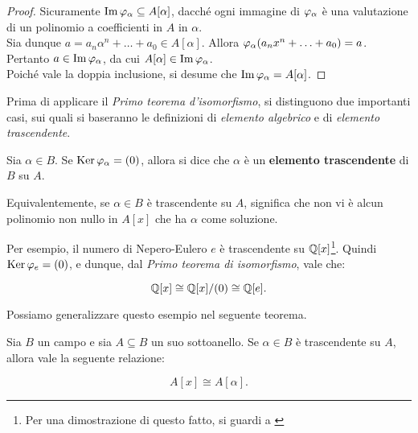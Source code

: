 \documentclass[11pt]{scrbook}
\begin{document}
\begin{proof} Sicuramente $\operatorname{Im} \varphi_\alpha \subseteq A[\alpha]$,
    dacché ogni immagine di $\varphi_\alpha$ è una valutazione di un
    polinomio a coefficienti in $A$ in $\alpha$. \\

    Sia dunque $a=a_n \alpha^n + \ldots + a_0 \in A[\alpha]$. Allora
    $\varphi_\alpha(a_n x^n + \ldots + a_0) = a$. Pertanto $a \in \operatorname{Im}
        \varphi_\alpha$, da cui $A[\alpha] \in \operatorname{Im} \varphi_\alpha$. \\

    Poiché vale la doppia inclusione, si desume che $\operatorname{Im} \varphi_\alpha =
        A[\alpha]$.
\end{proof}

Prima di applicare il \textit{Primo teorema d'isomorfismo}, si
distinguono due importanti casi, sui quali si baseranno le
definizioni di \textit{elemento algebrico} e di
\textit{elemento trascendente}.

\begin{definition}
    Sia $\alpha \in B$. Se $\operatorname{Ker} \varphi_\alpha = (0)$, allora si
    dice che $\alpha$ è un \textbf{elemento trascendente} di
    $B$ su $A$.
\end{definition}

\begin{remark*}
    Equivalentemente, se $\alpha \in B$ è trascendente su $A$,
    significa che non vi è alcun polinomio non nullo in $A[x]$ che ha $\alpha$
    come soluzione.
\end{remark*}

\begin{example}
    Per esempio, il numero di Nepero-Eulero $e$ è trascendente su $\mathbb{Q}[x]$\footnote{Per una dimostrazione di questo fatto, si
        guardi a \cite[pp.~234-237]{herstein2010algebra}}. Quindi
    $\operatorname{Ker} \varphi_e = (0)$, e dunque, dal \textit{Primo teorema di
        isomorfismo}, vale che:

    \[ \mathbb{Q}[x] \cong \mathbb{Q}[x]/(0) \cong \mathbb Q[e]. \]
\end{example}

Possiamo generalizzare questo esempio nel seguente teorema.

\begin{theorem}
    \label{th:isomorfismo_trascendente}
    Sia $B$ un campo e sia $A \subseteq B$ un suo sottoanello.
    Se $\alpha \in B$ è trascendente su $A$, allora vale
    la seguente relazione:

    \[ A[x] \cong A[\alpha]. \]
\end{theorem}
\end{document}
